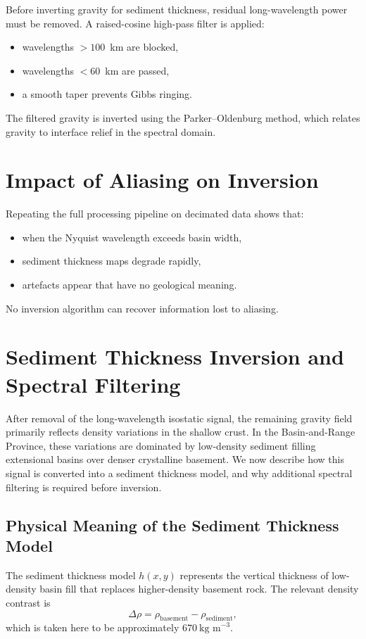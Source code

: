 \documentclass[11pt,a4paper]{article}
\begin{document}
Before inverting gravity for sediment thickness,
residual long-wavelength power must be removed.
A raised-cosine high-pass filter is applied:
\begin{itemize}
  \item wavelengths $> 100$~km are blocked,
  \item wavelengths $< 60$~km are passed,
  \item a smooth taper prevents Gibbs ringing.
\end{itemize}

The filtered gravity is inverted using the Parker--Oldenburg method,
which relates gravity to interface relief in the spectral domain.

\section{Impact of Aliasing on Inversion}

Repeating the full processing pipeline on decimated data shows that:
\begin{itemize}
  \item when the Nyquist wavelength exceeds basin width,
  \item sediment thickness maps degrade rapidly,
  \item artefacts appear that have no geological meaning.
\end{itemize}

No inversion algorithm can recover information lost to aliasing.

\section{Sediment Thickness Inversion and Spectral Filtering}

After removal of the long-wavelength isostatic signal, the remaining gravity field
primarily reflects density variations in the shallow crust.
In the Basin-and-Range Province, these variations are dominated by
low-density sediment filling extensional basins over denser crystalline basement.
We now describe how this signal is converted into a sediment thickness model,
and why additional spectral filtering is required before inversion.

\subsection{Physical Meaning of the Sediment Thickness Model}

The sediment thickness model $h(x,y)$ represents the vertical thickness of
low-density basin fill that replaces higher-density basement rock.
The relevant density contrast is
\begin{equation}
\Delta\rho = \rho_{\text{basement}} - \rho_{\text{sediment}},
\end{equation}
which is taken here to be approximately $670~\text{kg m}^{-3}$.
\end{document}
